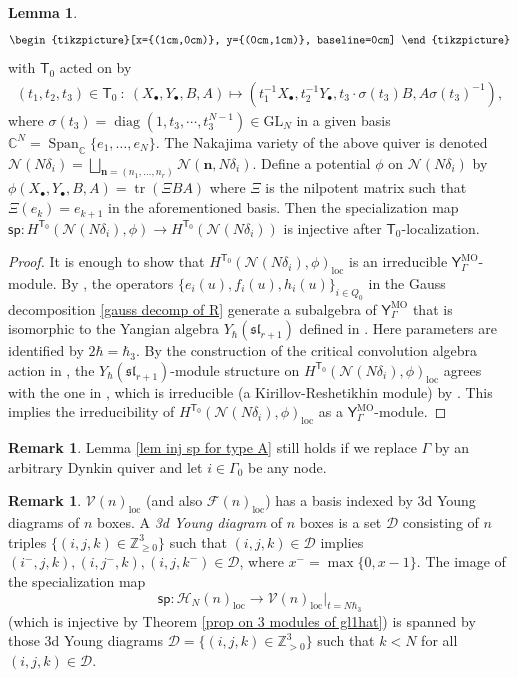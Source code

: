 \documentclass[10pt]{amsart}
\theoremstyle{definition}
\newtheorem{Lemma}[Theorem]{Lemma}
\newtheorem{Remark}[Theorem]{Remark}
\numberwithin{equation}{section}
\newcommand{\GL}{\mathrm{GL}}
\newcommand{\bC}{\mathbb{C}}
\newcommand{\bZ}{\mathbb{Z}}
\newcommand{\cF}{\mathcal{F}}
\newcommand{\cH}{\mathcal{H}}
\newcommand{\cN}{\mathcal{N}}
\newcommand{\cV}{\mathcal{V}}
\newcommand{\loc}{\mathrm{loc}}
\newcommand{\sT}{\mathsf{T}}
\newcommand{\diag}{\operatorname{diag}}
\newcommand{\Span}{\operatorname{Span}}
\newcommand{\tr}{\operatorname{tr}}
\begin{document}
\begin{Lemma}
\begin{equation*}
\begin{tikzpicture}[x={(1cm,0cm)}, y={(0cm,1cm)}, baseline=0cm]
\end{tikzpicture}
\end{equation*}
with $\sT_0$ acted on by 
\begin{align*}
    (t_1,t_2,t_3)\in \sT_0\:\colon \: (X_\bullet,Y_{\bullet},B,A)\mapsto (t_1^{-1}X_\bullet,t_2^{-1}Y_\bullet,t_3\cdot\sigma(t_3)B,A\sigma(t_3)^{-1}),
\end{align*}
where $\sigma(t_3)=\diag(1,t_3,\cdots,t_3^{N-1})\in \GL_N$ in a given basis $\bC^N=\Span_\bC\{e_1,\ldots,e_N\}$. The Nakajima variety of the above quiver is denoted $\cN(N\delta_i)=\bigsqcup_{\mathbf n=(n_1,\ldots,n_r)}\cN(\mathbf n,N\delta_i)$. Define a potential $\phi$ on $\cN(N\delta_i)$ by $\phi(X_\bullet,Y_{\bullet},B,A)=\tr(\Xi BA)$ where $\Xi$ is the nilpotent matrix such that $\Xi(e_k)=e_{k+1}$ in the aforementioned basis. Then the specialization map $\mathsf{sp}\colon H^{\sT_0}(\cN(N\delta_i),\phi)\to H^{\sT_0}(\cN(N\delta_i))$ is injective after $\sT_0$-localization.
\end{Lemma}

\begin{proof}
It is enough to show that $H^{\sT_0}(\cN(N\delta_i),\phi)_\loc$ is an irreducible $\mathsf Y_{\Gamma}^{\text{MO}}$-module. By \cite[Cor.\,6.2.3]{McB}, the operators $\{e_i(u),f_i(u),h_i(u)\}_{i\in Q_0}$ in the Gauss decomposition \eqref{gauss decomp of R} generate a subalgebra of $\mathsf Y_{\Gamma}^{\text{MO}}$ that is isomorphic to the Yangian algebra $Y_{\hbar}(\mathfrak{sl}_{r+1})$ defined in \cite{V}. Here parameters are identified by $2\hbar=\hbar_3$. By the construction of the critical convolution algebra action in \cite[\S 3]{VV2}, the $Y_{\hbar}(\mathfrak{sl}_{r+1})$-module structure on $H^{\sT_0}(\cN(N\delta_i),\phi)_\loc$ agrees with the one in \cite[Thm.~4.3(e)]{VV2}, which is irreducible (a Kirillov-Reshetikhin module) by \cite[Thm.~4.5]{VV2}. This implies the irreducibility of $H^{\sT_0}(\cN(N\delta_i),\phi)_\loc$ as a $\mathsf Y_{\Gamma}^{\text{MO}}$-module.
\end{proof}


\begin{Remark}
Lemma \ref{lem inj sp for type A} still holds if we replace $\Gamma$ by an arbitrary Dynkin quiver and let $i\in \Gamma_0$ be any node.
\end{Remark}


\begin{Remark}
$\cV(n)_\loc$ (and also $\cF(n)_\loc$) has a basis indexed by 3d Young diagrams of $n$ boxes. A \textit{3d Young diagram} of $n$ boxes is a set $\mathcal D$ consisting of $n$ triples $\{(i,j,k)\in \bZ_{\geqslant 0}^3\}$ such that $(i,j,k)\in \mathcal D$ implies $(i^-,j,k),(i,j^-,k),(i,j,k^-)\in \mathcal D$, where $x^-=\max\{0,x-1\}$. The image of the specialization map 
$$\mathsf{sp}\colon \cH_N(n)_\loc\to \cV(n)_\loc|_{t=N\hbar_3}$$ (which is injective by Theorem \ref{prop on 3 modules of gl1hat}) is spanned by those 3d Young diagrams $\mathcal D=\{(i,j,k)\in \bZ_{>0}^3\}$ such that $k<N$ for all $(i,j,k)\in \mathcal D$.
\end{Remark}
\end{document}
